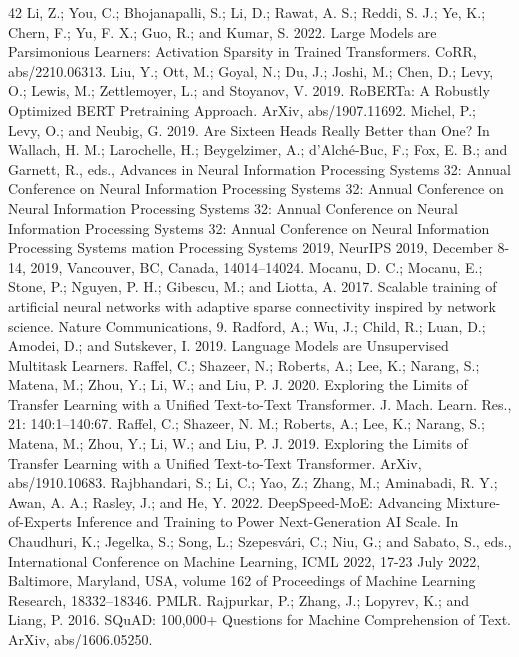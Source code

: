 \documentclass[11pt,a4paper]{article}
\begin{document}
\begin{thebibliography}{42}
 Li, Z.; You, C.; Bhojanapalli, S.; Li, D.; Rawat, A. S.; Reddi, S. J.; Ye, K.; Chern, F.; Yu, F. X.; Guo, R.; and Kumar, S. 2022. Large Models are Parsimonious Learners: Activation Sparsity in Trained Transformers. CoRR, abs/2210.06313.
 Liu, Y.; Ott, M.; Goyal, N.; Du, J.; Joshi, M.; Chen, D.; Levy, O.; Lewis, M.; Zettlemoyer, L.; and Stoyanov, V. 2019. RoBERTa: A Robustly Optimized BERT Pretraining Approach. ArXiv, abs/1907.11692.
 Michel, P.; Levy, O.; and Neubig, G. 2019. Are Sixteen Heads Really Better than One? In Wallach, H. M.; Larochelle, H.; Beygelzimer, A.; d'Alché-Buc, F.; Fox, E. B.; and Garnett, R., eds., Advances in Neural Information Processing Systems 32: Annual Conference on Neural Information Processing Systems 32: Annual Conference on Neural Information Processing Systems 32: Annual Conference on Neural Information Processing Systems 32: Annual Conference on Neural Information Processing Systems
 mation Processing Systems 2019, NeurIPS 2019, December 8-14, 2019, Vancouver, BC, Canada, 14014–14024.
 Mocanu, D. C.; Mocanu, E.; Stone, P.; Nguyen, P. H.; Gibescu, M.; and Liotta, A. 2017. Scalable training of artificial neural networks with adaptive sparse connectivity inspired by network science. Nature Communications, 9.
 Radford, A.; Wu, J.; Child, R.; Luan, D.; Amodei, D.; and Sutskever, I. 2019. Language Models are Unsupervised Multitask Learners.
 Raffel, C.; Shazeer, N.; Roberts, A.; Lee, K.; Narang, S.; Matena, M.; Zhou, Y.; Li, W.; and Liu, P. J. 2020. Exploring the Limits of Transfer Learning with a Unified Text-to-Text Transformer. J. Mach. Learn. Res., 21: 140:1–140:67.
 Raffel, C.; Shazeer, N. M.; Roberts, A.; Lee, K.; Narang, S.; Matena, M.; Zhou, Y.; Li, W.; and Liu, P. J. 2019. Exploring the Limits of Transfer Learning with a Unified Text-to-Text Transformer. ArXiv, abs/1910.10683.
 Rajbhandari, S.; Li, C.; Yao, Z.; Zhang, M.; Aminabadi, R. Y.; Awan, A. A.; Rasley, J.; and He, Y. 2022. DeepSpeed-MoE: Advancing Mixture-of-Experts Inference and Training to Power Next-Generation AI Scale. In Chaudhuri, K.; Jegelka, S.; Song, L.; Szepesvári, C.; Niu, G.; and Sabato, S., eds., International Conference on Machine Learning, ICML 2022, 17-23 July 2022, Baltimore, Maryland, USA, volume 162 of Proceedings of Machine Learning Research, 18332–18346. PMLR.
 Rajpurkar, P.; Zhang, J.; Lopyrev, K.; and Liang, P. 2016. SQuAD: 100,000+ Questions for Machine Comprehension of Text. ArXiv, abs/1606.05250.

\end{thebibliography}
\end{document}
